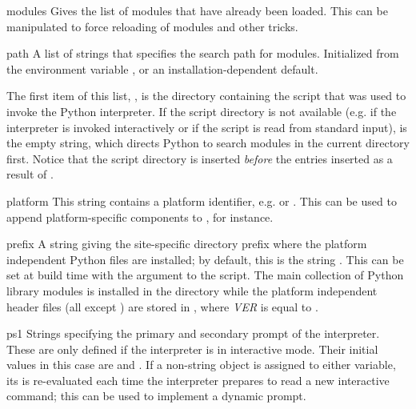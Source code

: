 \begin{datadesc}{modules}
  Gives the list of modules that have already been loaded.
  This can be manipulated to force reloading of modules and other tricks.
\end{datadesc}

\begin{datadesc}{path}
  A list of strings that specifies the search path for modules.
  Initialized from the environment variable , or an
  installation-dependent default.  

The first item of this list, , is the 
directory containing the script that was used to invoke the Python 
interpreter.  If the script directory is not available (e.g.  if the 
interpreter is invoked interactively or if the script is read from 
standard input),  is the empty string, which directs 
Python to search modules in the current directory first.  Notice that 
the script directory is inserted \emph{before} the entries inserted as 
a result of .  
\end{datadesc}

\begin{datadesc}{platform}
This string contains a platform identifier, e.g.  or
.  This can be used to append platform-specific
components to , for instance. 
\end{datadesc}

\begin{datadesc}{prefix}
A string giving the site-specific directory prefix where the platform
independent Python files are installed; by default, this is the string
.  This can be set at build time with the
 argument to the  script.  The main
collection of Python library modules is installed in the directory
 while the platform
independent header files (all except ) are stored in
,
where \emph{VER} is equal to .

\end{datadesc}

\begin{datadesc}{ps1}
  Strings specifying the primary and secondary prompt of the
  interpreter.  These are only defined if the interpreter is in
  interactive mode.  Their initial values in this case are
   and .  If a non-string object is assigned
  to either variable, its  is re-evaluated each time the
  interpreter prepares to read a new interactive command; this can be
  used to implement a dynamic prompt.
\end{datadesc}

